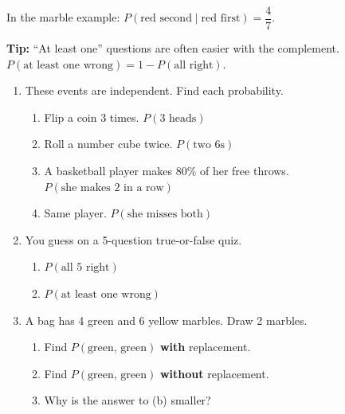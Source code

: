 \documentclass[11pt]{article}
\begin{document}
\vspace{0.4em}
In the marble example: $P(\text{red second} \mid \text{red first}) = \dfrac{4}{7}$.

\vspace{0.8em}
\textbf{Tip:} ``At least one'' questions are often easier with the complement.
$P(\text{at least one wrong}) = 1 - P(\text{all right})$.

\partner

\newpage
\begin{enumerate}

\item These events are independent. Find each probability.
\begin{enumerate}[itemsep=1.4em]
  \item Flip a coin 3 times. $P(\text{3 heads})$ 
  \item Roll a number cube twice. $P(\text{two 6s})$ 
  \item A basketball player makes 80\% of her free throws. $P(\text{she makes 2 in a row})$ 
  \item Same player. $P(\text{she misses both})$ 
\end{enumerate}
\work{1em}

\item You guess on a 5-question true-or-false quiz.
\begin{enumerate}[itemsep=1.4em]
  \item $P(\text{all 5 right})$ 
  \item $P(\text{at least one wrong})$ 
\end{enumerate}
\work{1em}

\item A bag has 4 green and 6 yellow marbles. Draw 2 marbles.
\begin{enumerate}[itemsep=1em]
  \item Find $P(\text{green, green})$ \textbf{with} replacement.

  \work{2em}
  \item Find $P(\text{green, green})$ \textbf{without} replacement.

  \work{2em}
  \item Why is the answer to (b) smaller?


\end{enumerate}
\end{enumerate}
\end{document}
